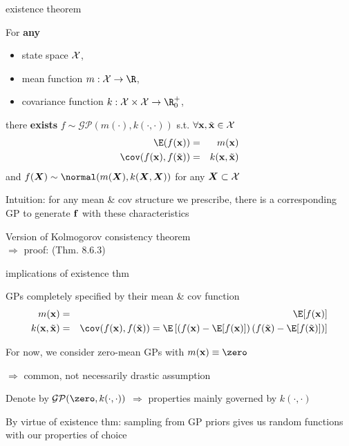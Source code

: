 \documentclass[11pt,compress,t,notes=noshow, xcolor=table]{beamer}
\begin{document}
\begin{framei}[sep=L]{existence theorem}
\item For \textbf{any} 
\begin{itemize}
\item state space $\mathcal{X}$,
\item mean function $m: \Xspace \rightarrow \R$,
\item covariance function $k: \Xspace \times \Xspace \rightarrow \R^+_0$, 
\end{itemize}
\vfill
there \textbf{exists} $f \sim \mathcal{GP}(m(\cdot), k(\cdot, \cdot))$ s.t. $\forall \mathbf{x}, \tilde{\mathbf{x}} \in \mathcal{X}$
\begin{eqnarray*}
\E(\fx) &=& m(\xv) \\
\cov(\fx, f(\tilde{\xv})) &=& k(\xv, \tilde{\xv})
\end{eqnarray*}
and $f(\bm{X}) \sim \normal(m(\bm{X}), k(\bm{X}, \bm{X}))$ for any $\bm{X} \subset \mathcal{X}$
\item Intuition: for any mean \& cov structure we prescribe, there is a corresponding GP to generate $\mathbf{f}$ with these characteristics
\item Version of Kolmogorov consistency theorem  \\
$\Rightarrow$ proof:  (Thm. 8.6.3)
\end{framei}

\begin{framei}[sep=L]{implications of existence thm}
\item GPs completely specified by their mean \& cov function
\begin{eqnarray*}
m(\xv) &=& \E[f(\xv)] \\
k(\xv, \tilde{\xv}) &=& \cov(\fx, f(\tilde{\xv})) = \E \left[\left( f(\xv) - \E[f(\xv)] \right) \left( f(\tilde{\xv}) - \E[f(\tilde{\xv})] \right) \right]
\end{eqnarray*}
\item For now, we consider zero-mean GPs with $m(\xv) \equiv \zero$ 

$\Rightarrow$ common, not necessarily drastic assumption 
\item Denote by $\mathcal{GP}(\zero, k(\cdot, \cdot))$ $\Rightarrow$ properties mainly governed by $k(\cdot, \cdot)$
\item By virtue of existence thm: sampling from GP priors gives us random functions with our properties of choice
\end{framei}
\end{document}
